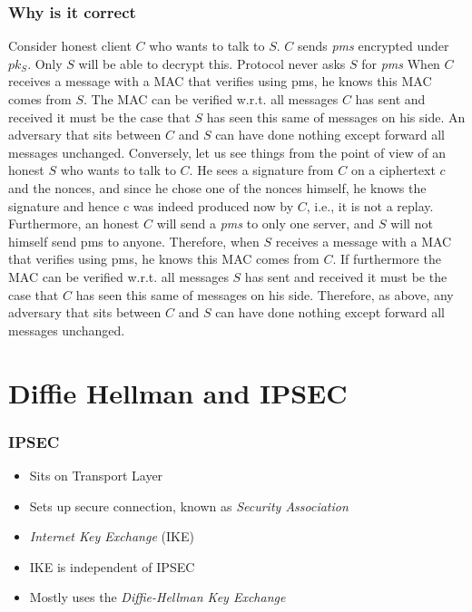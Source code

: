            \begin{frame}
                \frametitle{Why is it correct}
                    Consider honest client $C$ who wants to talk to $S$. $C$ sends \textit{pms} encrypted under $pk_S$.
                    Only $S$ will be able to decrypt this. 
                    Protocol never asks $S$ for \textit{pms} 
                    When $C$ receives a message with a MAC that verifies using pms, he knows this MAC comes from $S$. 
                    The MAC can be verified w.r.t. all messages $C$ has sent and received it must be the case that $S$ has seen this same of messages on his side. 
                    An adversary that sits between $C$ and $S$ can have done nothing except forward all messages unchanged. 
                    Conversely, let us see things from the point of view of an honest $S$ who wants to talk to $C$. He sees a signature from $C$ on a ciphertext $c$ and the nonces, and since he chose one of the nonces himself, he knows the signature and hence c was indeed produced now by $C$, i.e., it is not a replay. Furthermore, an honest $C$ will send a \textit{pms} to only one server, and $S$ will not himself send pms to anyone. Therefore, when $S$ receives a message with a MAC that verifies using pms, he knows this MAC comes from $C$. If furthermore the MAC can be verified w.r.t. all messages $S$ has sent and received it must be the case that $C$ has seen this same of messages on his side. Therefore, as above, any adversary that sits between $C$ and $S$ can have done nothing except forward all messages unchanged.
            \end{frame}

\section{Diffie Hellman and IPSEC}
    \begin{frame}
        \frametitle{IPSEC}
            \begin{itemize}
                \item Sits on Transport Layer
                \item Sets up secure connection, known as \textit{Security Association}
                \item \textit{Internet Key Exchange} (IKE)
                \item IKE is independent of IPSEC
                \item Mostly uses the \textit{Diffie-Hellman Key Exchange}
            \end{itemize}
    \end{frame}


